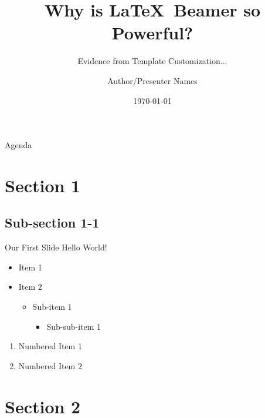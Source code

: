 \documentclass[t]{beamer} %
\title[Footer - put anything (or nothing) here]{Why is \LaTeX \ Beamer so Powerful?}
\subtitle{Evidence from Template Customization...}
\author[Short Author Name]{Author/Presenter Names}
\institute[Monash Uni]{Department of Banking and Finance, Monash Business School}
\date{\today}
\begin{document}
\begin{frame}
  \titlepage
\end{frame}

\begin{frame}{Agenda}
  \tableofcontents
\end{frame}


\section{Section 1}

\subsection{Sub-section 1-1}

\begin{frame}{Our First Slide}
  Hello World!
  \vspace{\baselineskip}
  \vspace{\baselineskip}

  \begin{itemize}
    \item Item 1
    \item Item 2
          \begin{itemize}
            \item Sub-item 1
                  \begin{itemize}
                    \item Sub-sub-item 1
                  \end{itemize}
          \end{itemize}
  \end{itemize}

  \begin{enumerate}
    \item Numbered Item 1
    \item Numbered Item 2
  \end{enumerate}
\end{frame}

\section{Section 2}
\end{document}
